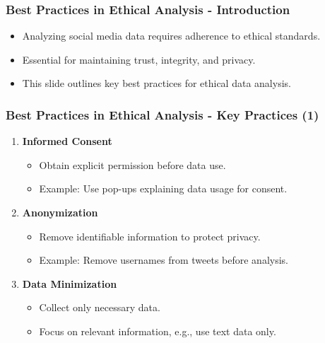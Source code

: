 \documentclass{beamer}
\begin{document}
\begin{frame}[fragile]
    \frametitle{Best Practices in Ethical Analysis - Introduction}
    \begin{itemize}
        \item Analyzing social media data requires adherence to ethical standards.
        \item Essential for maintaining trust, integrity, and privacy.
        \item This slide outlines key best practices for ethical data analysis.
    \end{itemize}
\end{frame}

\begin{frame}[fragile]
    \frametitle{Best Practices in Ethical Analysis - Key Practices (1)}
    \begin{enumerate}
        \item \textbf{Informed Consent}
            \begin{itemize}
                \item Obtain explicit permission before data use.
                \item Example: Use pop-ups explaining data usage for consent.
            \end{itemize}
        
        \item \textbf{Anonymization}
            \begin{itemize}
                \item Remove identifiable information to protect privacy.
                \item Example: Remove usernames from tweets before analysis.
            \end{itemize}
            
        \item \textbf{Data Minimization}
            \begin{itemize}
                \item Collect only necessary data.
                \item Focus on relevant information, e.g., use text data only.
            \end{itemize}
    \end{enumerate}
\end{frame}
\end{document}
